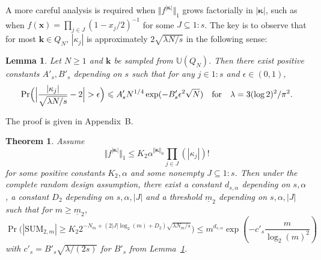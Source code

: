 \documentclass{article}
\newtheorem{theorem}{Theorem}
\newtheorem{lemma}{Lemma}
\theoremstyle{definition}
\renewcommand{\ge}{\geqslant}
\renewcommand{\leq}{\leqslant}
\renewcommand{\geq}{\geqslant}
\newcommand{\bsk}{\boldsymbol{k}}
\newcommand{\bsx}{\boldsymbol{x}}
\newcommand{\bskappa}{\boldsymbol{\kappa}}
\newcommand{\dunif}{\mathbb{U}}
\newcommand{\appB}{B}
\begin{document}
A more careful analysis is required when $\Vert f^{|\bskappa|}\Vert_1$ grows factorially in $|\bskappa|$, such as when $f(\bsx)=\prod_{j\in J} (1-x_j/2)^{-1}$ for some $J\subseteq 1{:}s$. The key is to observe that for most $\bsk\in Q_N$, $|\kappa_j|$ is approximately $ 2\sqrt{\lambda N/s}$ in the following sense:

\begin{lemma}\label{lem:meankappa}
    Let $N\geq 1$ and $\bsk$ be sampled from $\dunif (Q_N)$. Then there exist positive constants $A'_s, B'_s$ depending on $s$ such that for any $j\in 1{:}s$ and $\epsilon\in (0,1)$,
    \begin{equation*}
        \Pr\Bigl(\Big|\frac{|\kappa_j|}{\sqrt{\lambda N/s}}-2\Big|>\epsilon\Bigr)\leq A'_sN^{1/4}\exp(-B'_s \epsilon^2 \sqrt{N}) \quad\text{for} \quad\lambda=3(\log 2)^2/\pi^2.
    \end{equation*}
\end{lemma}
The proof is given in Appendix~\appB.

\begin{theorem}\label{thm:sum2case2}
 Assume
$$\Vert f^{|\bskappa|}\Vert_1\leq K_2\alpha^{\Vert\bskappa\Vert_0}\prod_{j\in J} (|\kappa_j|)!$$
for some positive constants $K_2,\alpha$ and some nonempty $J\subseteq 1{:}s$. Then under the complete random design assumption, there exist a constant $d_{s,\alpha}$ depending on $s,\alpha$, a constant $D_2$  depending on $s,\alpha,|J|$ and a threshold $\underline{m}_2$ depending on $s,\alpha,|J|$ such that for $m\geq \underline{m}_2$, 
$$\Pr\Big(|\mathrm{SUM}_{2,m}|\ge K_2 2^{-N_m+(2|J|\log_2(m)+D_2)\sqrt{\lambda N_m/s }} \Big)\leq m^{d_{s,\alpha}}\exp(-c'_s\frac{m}{\log_2(m)^2})$$
with $c'_s=B'_s \sqrt{\lambda/(2s)}$ for $B'_s$ from Lemma~\ref{lem:meankappa}.

\end{theorem}
\end{document}
